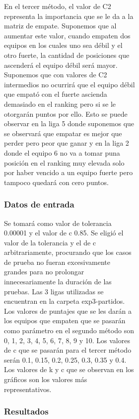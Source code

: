 \begin{figure}[h]
\begin{figure}[h]
\begin{figure}[h]
            En el tercer método, el valor de C2 representa la importancia que se le da a la matriz de empate. Suponemos que al aumentar este valor, cuando empaten dos equipos en los cuales uno sea débil y el otro fuerte, la cantidad de posiciones que ascenderá el equipo débil será mayor. Suponemos que con valores de C2 intermedios no ocurrirá que el equipo débil que empató con el fuerte ascienda demasiado en el ranking pero si se le otorgarán puntos por ello. Esto se puede observar en la liga 5 donde suponemos que se observará que empatar es mejor que perder pero peor que ganar y en la liga 2 donde el equipo 6 no va a tomar puna posición en el ranking muy elevada solo por haber vencido a un equipo fuerte pero tampoco quedará con cero puntos.

            \subsubsection*{Datos de entrada}
            Se tomará como valor de tolerancia 0.00001 y el valor de c 0.85. Se eligió el valor de la tolerancia y el de c arbitrariamente, procurando que los casos de prueba no fueran excesivamente grandes para no prolongar innecesariamente la duración de las pruebas. Las 3 ligas utilizadas se encuentran en la carpeta exp3-partidos. Los valores de puntajes que se les darán a los equipos que empaten que se pasarán como parámetro en el segundo método son 0, 1, 2, 3, 4, 5, 6, 7, 8, 9 y 10. Los valores de c que se pasarán para el tercer método serán 0.1, 0.15, 0.2, 0.25, 0.3, 0.35 y 0.4. Los valores de k y c que se observan en los gráficos son los valores más representativos.

            \subsubsection*{Resultados}

             \begin{figure}
                \begin{center}


\end{center}
\end{figure}
\end{figure}
\end{figure}
\end{figure}
